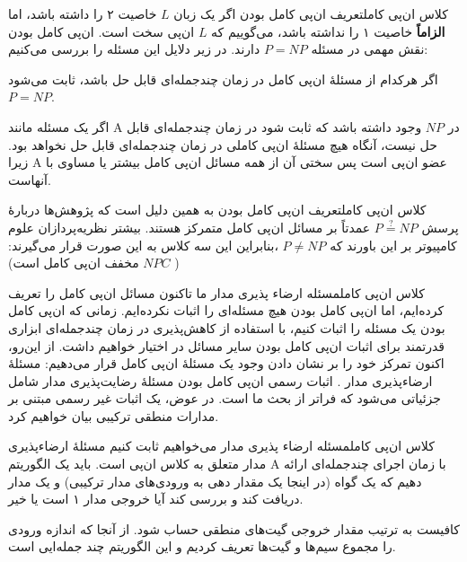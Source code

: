 \begin{itemframe-s}{کلاس ان‌پی کامل}{تعریف ان‌پی کامل بودن}
\itm
اگر یک زبان $L$ خاصیت ۲ را داشته باشد، اما \textbf{الزاماً} خاصیت ۱ را نداشته باشد، می‌گوییم که
 $L$
ان‌پی سخت
 است.
\itm
ان‌پی کامل بودن نقش مهمی در مسئله
$P = NP$
دارند. در زیر دلایل این مسئله را بررسی می‌کنیم:
\item[1]
اگر هرکدام از مسئلهٔ ان‌پی کامل در زمان چندجمله‌ای قابل حل باشد، ثابت می‌شود $P = NP$.
\item[2]
 اگر یک مسئله مانند A در
$NP$
وجود داشته باشد که ثابت شود در زمان چندجمله‌ای قابل حل نیست، آنگاه هیچ مسئلهٔ ان‌پی کاملی در زمان چندجمله‌ای قابل حل نخواهد بود. زیرا A عضو ان‌پی است پس سختی آن از همه مسائل ان‌پی کامل بیشتر یا مساوی با آنهاست.
\end{itemframe-s}

\begin{itemframe-s}{کلاس ان‌پی کامل}{تعریف ان‌پی کامل بودن}
\itm
به همین دلیل است که پژوهش‌ها دربارهٔ پرسش
$P \stackrel{?}{=} NP$
عمدتاً بر مسائل ان‌پی کامل متمرکز هستند.
\itm
بیشتر نظریه‌پردازان علوم کامپیوتر بر این باورند که
$P \ne NP$
،بنابراین این سه کلاس به این صورت قرار می‌گیرند: (
$NPC$
مخفف ان‌پی کامل است)
\end{itemframe-s}

\begin{itemframe-s}{کلاس ان‌پی کامل}{مسئله ارضاء پذیری مدار}
\itm
ما تاکنون مسائل ان‌پی کامل را تعریف کرده‌ایم، اما ان‌پی‌ کامل بودن هیچ مسئله‌ای را اثبات نکرده‌ایم.
\itm
زمانی که ان‌پی‌ کامل بودن یک مسئله را اثبات کنیم، با استفاده از کاهش‌پذیری در زمان چندجمله‌ای ابزاری قدرتمند برای اثبات ان‌پی‌ کامل بودن سایر مسائل در اختیار خواهیم داشت.
\itm
از این‌رو، اکنون تمرکز خود را بر نشان دادن وجود یک مسئلهٔ ان‌پی کامل قرار می‌دهیم: مسئلهٔ ارضاء‌پذیری مدار
 .
\itm
اثبات رسمی ان‌پی‌ کامل بودن مسئلهٔ رضایت‌پذیری مدار شامل جزئیاتی می‌شود که فراتر از بحث ما است. در عوض، یک اثبات غیر رسمی مبتنی بر مدارات منطقی ترکیبی بیان خواهیم کرد.
\end{itemframe-s}

\begin{itemframe-s}{کلاس ان‌پی کامل}{مسئله ارضاء پذیری مدار}
\itm
می‌خواهیم ثابت کنیم مسئلهٔ ارضاء‌پذیری مدار متعلق به کلاس ان‌پی است.
\itm
باید یک الگوریتم A با زمان اجرای چندجمله‌ای ارائه ‌دهیم که یک گواه (در اینجا یک مقدار دهی به ورودی‌های مدار ترکیبی) و یک مدار دریافت کند و بررسی کند آیا خروجی مدار ۱ است یا خیر.

\itm
کافیست به ترتیب مقدار خروجی گیت‌های منطقی حساب شود. از آنجا که اندازه ورودی را مجموع سیم‌ها و گیت‌ها تعریف کردیم و این الگوریتم چند جمله‌ایی است.
\end{itemframe-s}

